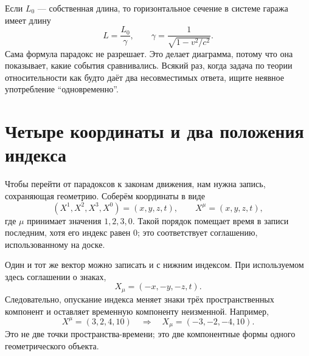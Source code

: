 Если \(L_0\) — собственная длина, то горизонтальное сечение в системе гаража имеет длину
\begin{equation}
L=\frac{L_0}{\gamma},
\qquad
\gamma=\frac{1}{\sqrt{1-v^2/c^2}}.
\end{equation}
Сама формула парадокс не разрешает. Это делает диаграмма, потому что она показывает, какие события сравнивались. Всякий раз, когда задача по теории относительности как будто даёт два несовместимых ответа, ищите неявное употребление ``одновременно''.

\section{Четыре координаты и два положения индекса}

Чтобы перейти от парадоксов к законам движения, нам нужна запись, сохраняющая геометрию. Соберём координаты в виде
\begin{equation}
(X^1,X^2,X^3,X^0)=(x,y,z,t),
\qquad X^\mu=(x,y,z,t),
\end{equation}
где \(\mu\) принимает значения \(1,2,3,0\). Такой порядок помещает время в записи последним, хотя его индекс равен \(0\); это соответствует соглашению, использованному на доске.

\begin{classroomqa}
\end{classroomqa}

Один и тот же вектор можно записать и с нижним индексом. При используемом здесь соглашении о знаках,
\begin{equation}
X_\mu=(-x,-y,-z,t).
\end{equation}
Следовательно, опускание индекса меняет знаки трёх пространственных компонент и оставляет временную компоненту неизменной. Например,
\begin{equation}
X^\mu=(3,2,4,10)
\quad\Longrightarrow\quad
X_\mu=(-3,-2,-4,10).
\end{equation}
Это не две точки пространства-времени; это две компонентные формы одного геометрического объекта.

\begin{classroomqa}
\end{classroomqa}

